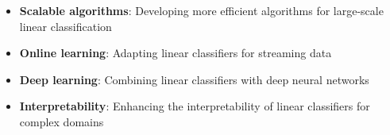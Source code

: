 \documentclass{article}
\begin{document}
\begin{itemize}
    \item \textbf{Scalable algorithms}: Developing more efficient algorithms for large-scale linear classification
    \item \textbf{Online learning}: Adapting linear classifiers for streaming data
    \item \textbf{Deep learning}: Combining linear classifiers with deep neural networks
    \item \textbf{Interpretability}: Enhancing the interpretability of linear classifiers for complex domains
\end{itemize}
\end{document}
